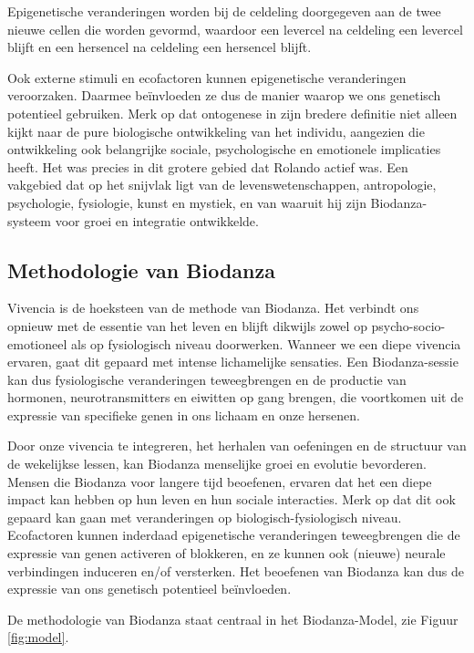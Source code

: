 \documentclass[
  11pt,
]{book}
\begin{document}
Epigenetische veranderingen worden bij de celdeling doorgegeven aan de twee nieuwe cellen die worden gevormd, waardoor een levercel na celdeling een levercel blijft en een hersencel na celdeling een hersencel blijft.

Ook externe stimuli en ecofactoren kunnen epigenetische veranderingen veroorzaken.
Daarmee beïnvloeden ze dus de manier waarop we ons genetisch potentieel gebruiken.
Merk op dat ontogenese in zijn bredere definitie niet alleen kijkt naar de pure biologische ontwikkeling van het individu, aangezien die ontwikkeling ook belangrijke sociale, psychologische en emotionele implicaties heeft. Het was precies in dit grotere gebied dat Rolando actief was. Een vakgebied dat op het snijvlak ligt van de levenswetenschappen, antropologie, psychologie, fysiologie, kunst en mystiek, en van waaruit hij zijn Biodanza-systeem voor groei en integratie ontwikkelde.

\hypertarget{methodologie-van-biodanza}{%
\subsection{Methodologie van Biodanza}\label{methodologie-van-biodanza}}

Vivencia is de hoeksteen van de methode van Biodanza. Het verbindt ons opnieuw met de essentie van het leven en blijft dikwijls zowel op psycho-socio-emotioneel als op fysiologisch niveau doorwerken. Wanneer we een diepe vivencia ervaren, gaat dit gepaard met intense lichamelijke sensaties. Een Biodanza-sessie kan dus fysiologische veranderingen teweegbrengen en de productie van hormonen, neurotransmitters en eiwitten op gang brengen, die voortkomen uit de expressie van specifieke genen in ons lichaam en onze hersenen.

Door onze vivencia te integreren, het herhalen van oefeningen en de structuur van de wekelijkse lessen, kan Biodanza menselijke groei en evolutie bevorderen. Mensen die Biodanza voor langere tijd beoefenen, ervaren dat het een diepe impact kan hebben op hun leven en hun sociale interacties. Merk op dat dit ook gepaard kan gaan met veranderingen op biologisch-fysiologisch niveau. Ecofactoren kunnen inderdaad epigenetische veranderingen teweegbrengen die de expressie van genen activeren of blokkeren, en ze kunnen ook (nieuwe) neurale verbindingen induceren en/of versterken. Het beoefenen van Biodanza kan dus de expressie van ons genetisch potentieel beïnvloeden.

De methodologie van Biodanza staat centraal in het Biodanza-Model, zie Figuur \ref{fig:model}.
\end{document}
